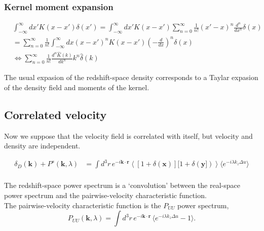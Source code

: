 \documentclass[a4paper,11pt, fleqn]{article}
\begin{document}
\subsubsection{Kernel moment expansion}

\begin{equation}\begin{split}
  &\int_{-\infty}^\infty dx' K(x - x') \delta(x')
    = \int_{-\infty}^\infty dx' K(x - x')
    \sum_{n=0}^\infty \frac{1}{n!} (x' - x)^n \frac{d^n}{dx^n} \delta(x)\\
  &= \sum_{n=0}^\infty \frac{1}{n!} \int_{-\infty}^\infty dx (x - x')^n K(x - x')
    \left( - \frac{d}{dx} \right)^n \delta(x) \\
  &\Leftrightarrow \sum_{n=0}^\infty \frac{1}{n!}
    \frac{d^n \hat{K}(k)}{dk^n} k^n \hat{\delta}(k)
\end{split}\end{equation}

The usual expasion of the redshift-space density corresponds to a
Taylar expasion of the density field and moments of the kernel.

\clearpage
\subsection{Correlated velocity}
Now we suppose that the velocity field is correlated with itself, but
velocity and density are independent.

\begin{equation}\begin{split}
  \delta_D(\bm{k}) + P^s(\bm{k}, \lambda)
    &= \int \! d^3 r \, e^{-i\bm{k}\cdot\bm{r}} \left\langle
  [1 + \delta(\bm{x})][ 1 + \delta(\bm{y}]) \right\rangle
    \Big\langle e^{-i\lambda k_z \Delta u} \Big\rangle\\
\end{split}\end{equation}

The redshift-space power spectrum is a `convolution' between the
real-space power spectrum and the pairwise-velocity characteristic
function.\\

The pairwise-velocity characteristic function is the $P_{UU}$ power spectrum,
\begin{equation}
  P_{UU}(\bm{k}, \lambda) = \int\! d^3 r \, e^{-i\bm{k}\cdot\bm{r}} \,
  \Big\langle e^{-i\lambda k_z \Delta u} - 1 \Big\rangle.
\end{equation}
\end{document}
